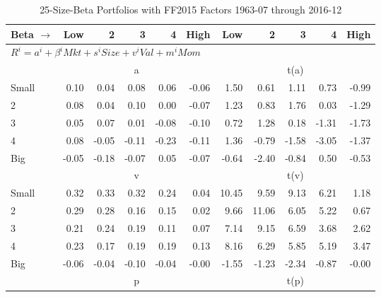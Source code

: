 
\begin{table}[!ht]
\centering
\caption{25-Size-Beta Portfolios with FF2015 Factors 1963-07 through 2016-12}
\begin{tabular}{lrrrrrrrrrr}
  \toprule
    Beta $\rightarrow$ & Low & 2 & 3 & 4 & High & Low & 2 & 3 & 4 & High \\ 
  \midrule
  \multicolumn{11}{l}{$R^i=a^i+\beta^iMkt+s^iSize+v^iVal+m^iMom$} \\

  
    
      & \multicolumn{5}{c}{a} & \multicolumn{5}{c}{t(a)}
    
    \\
      \cmidrule(r){2-6} \cmidrule(r){7-11}

    Small   & 0.10  & 0.04  & 0.08  & 0.06  & -0.06  & 1.50  & 0.61  & 1.11  & 0.73  & -0.99  \\
         2  & 0.08  & 0.04  & 0.10  & 0.00  & -0.07  & 1.23  & 0.83  & 1.76  & 0.03  & -1.29  \\
         3  & 0.05  & 0.07  & 0.01  & -0.08  & -0.10  & 0.72  & 1.28  & 0.18  & -1.31  & -1.73  \\
         4  & 0.08  & -0.05  & -0.11  & -0.23  & -0.11  & 1.36  & -0.79  & -1.58  & -3.05  & -1.37  \\
    Big     & -0.05  & -0.18  & -0.07  & 0.05  & -0.07  & -0.64  & -2.40  & -0.84  & 0.50  & -0.53  \\

  
    
      & \multicolumn{5}{c}{v} & \multicolumn{5}{c}{t(v)}
    
    \\
      \cmidrule(r){2-6} \cmidrule(r){7-11}

    Small   & 0.32  & 0.33  & 0.32  & 0.24  & 0.04  & 10.45  & 9.59  & 9.13  & 6.21  & 1.18  \\
         2  & 0.29  & 0.28  & 0.16  & 0.15  & 0.02  & 9.66  & 11.06  & 6.05  & 5.22  & 0.67  \\
         3  & 0.21  & 0.24  & 0.19  & 0.11  & 0.07  & 7.14  & 9.15  & 6.59  & 3.68  & 2.62  \\
         4  & 0.23  & 0.17  & 0.19  & 0.19  & 0.13  & 8.16  & 6.29  & 5.85  & 5.19  & 3.47  \\
    Big     & -0.06  & -0.04  & -0.10  & -0.04  & -0.00  & -1.55  & -1.23  & -2.34  & -0.87  & -0.00  \\

  
    
      & \multicolumn{5}{c}{p} & \multicolumn{5}{c}{t(p)}
    

\end{tabular}
\end{table}
